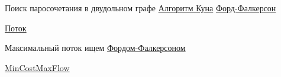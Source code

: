 Поиск паросочетания в двудольном графе
\href{https://neerc.ifmo.ru/wiki/index.php?title=%D0%90%D0%BB%D0%B3%D0%BE%D1%80%D0%B8%D1%82%D0%BC_%D0%9A%D1%83%D0%BD%D0%B0_%D0%B4%D0%BB%D1%8F_%D0%BF%D0%BE%D0%B8%D1%81%D0%BA%D0%B0_%D0%BC%D0%B0%D0%BA%D1%81%D0%B8%D0%BC%D0%B0%D0%BB%D1%8C%D0%BD%D0%BE%D0%B3%D0%BE_%D0%BF%D0%B0%D1%80%D0%BE%D1%81%D0%BE%D1%87%D0%B5%D1%82%D0%B0%D0%BD%D0%B8%D1%8F}{Алгоритм Куна}
\href{https://neerc.ifmo.ru/wiki/index.php?title=%D0%90%D0%BB%D0%B3%D0%BE%D1%80%D0%B8%D1%82%D0%BC_%D0%A4%D0%BE%D1%80%D0%B4%D0%B0-%D0%A4%D0%B0%D0%BB%D0%BA%D0%B5%D1%80%D1%81%D0%BE%D0%BD%D0%B0_%D0%B4%D0%BB%D1%8F_%D0%BF%D0%BE%D0%B8%D1%81%D0%BA%D0%B0_%D0%BC%D0%B0%D0%BA%D1%81%D0%B8%D0%BC%D0%B0%D0%BB%D1%8C%D0%BD%D0%BE%D0%B3%D0%BE_%D0%BF%D0%B0%D1%80%D0%BE%D1%81%D0%BE%D1%87%D0%B5%D1%82%D0%B0%D0%BD%D0%B8%D1%8F}{Форд-Фалкерсон}

\href{https://neerc.ifmo.ru/wiki/index.php?title=%D0%9E%D0%BF%D1%80%D0%B5%D0%B4%D0%B5%D0%BB%D0%B5%D0%BD%D0%B8%D0%B5_%D1%81%D0%B5%D1%82%D0%B8,_%D0%BF%D0%BE%D1%82%D0%BE%D0%BA%D0%B0}{Поток}

Максимальный поток ищем \href{https://neerc.ifmo.ru/wiki/index.php?title=%D0%90%D0%BB%D0%B3%D0%BE%D1%80%D0%B8%D1%82%D0%BC_%D0%A4%D0%BE%D1%80%D0%B4%D0%B0-%D0%A4%D0%B0%D0%BB%D0%BA%D0%B5%D1%80%D1%81%D0%BE%D0%BD%D0%B0,_%D1%80%D0%B5%D0%B0%D0%BB%D0%B8%D0%B7%D0%B0%D1%86%D0%B8%D1%8F_%D1%81_%D0%BF%D0%BE%D0%BC%D0%BE%D1%89%D1%8C%D1%8E_%D0%BF%D0%BE%D0%B8%D1%81%D0%BA%D0%B0_%D0%B2_%D0%B3%D0%BB%D1%83%D0%B1%D0%B8%D0%BD%D1%83}{Фордом-Фалкерсоном}

\href{https://neerc.ifmo.ru/wiki/index.php?title=%D0%9F%D0%BE%D1%82%D0%BE%D0%BA_%D0%BC%D0%B8%D0%BD%D0%B8%D0%BC%D0%B0%D0%BB%D1%8C%D0%BD%D0%BE%D0%B9_%D1%81%D1%82%D0%BE%D0%B8%D0%BC%D0%BE%D1%81%D1%82%D0%B8}{MinCostMaxFlow}

